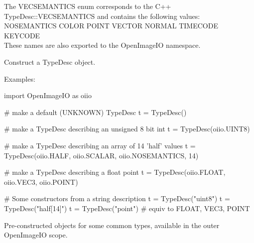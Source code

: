 The {\cf VECSEMANTICS} enum corresponds to the C++ {\cf TypeDesc::VECSEMANTICS} and
contains the following values: \\
{\cf NOSEMANTICS COLOR POINT VECTOR NORMAL TIMECODE KEYCODE} \\
These names are also exported to the {\cf OpenImageIO} namespace.
\apiend


Construct a {\cf TypeDesc} object.  

\noindent Examples:
\begin{code}
    import OpenImageIO as oiio

    # make a default (UNKNOWN) TypeDesc
    t = TypeDesc()

    # make a TypeDesc describing an unsigned 8 bit int
    t = TypeDesc(oiio.UINT8)

    # make a TypeDesc describing an array of 14 'half' values
    t = TypeDesc(oiio.HALF, oiio.SCALAR, oiio.NOSEMANTICS, 14)

    # make a TypeDesc describing a float point
    t = TypeDesc(oiio.FLOAT, oiio.VEC3, oiio.POINT)

    # Some constructors from a string description
    t = TypeDesc("uint8")
    t = TypeDesc("half[14]")
    t = TypeDesc("point")     # equiv to FLOAT, VEC3, POINT
\end{code}
\apiend

Pre-constructed \TypeDesc objects for some common types, available in the
outer OpenImageIO scope.


